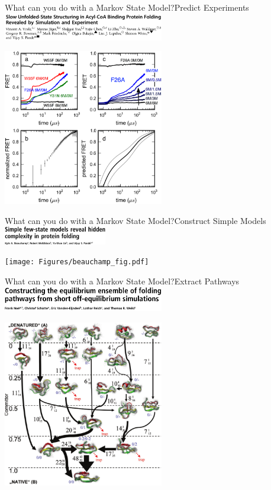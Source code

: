 \documentclass[10pt]{beamer}
\begin{document}
\begin{frame}{What can you do with a Markov State Model?}{Predict Experiments}
\includegraphics[width=7.0cm]{Figures/voelz.png}

\includegraphics[width=7.0cm]{Figures/voelz_fig.png}
 
 
\end{frame}

\begin{frame}{What can you do with a Markov State Model?}{Construct Simple Models}
\includegraphics[width=4.5cm]{Figures/beauchamp.png}

\texttt{[image: Figures/beauchamp\_fig.pdf]}
 
 
\end{frame}

\begin{frame}{What can you do with a Markov State Model?}{Extract Pathways}
\includegraphics[width=7.0cm]{Figures/noe.png}

\includegraphics[width=7.0cm]{Figures/noe_fig}
 
 
\end{frame}
\end{document}

